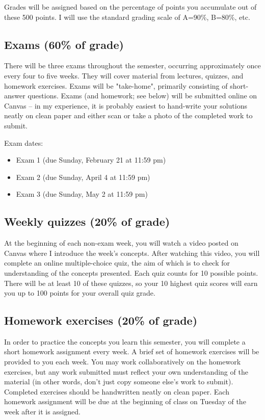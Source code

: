\documentclass[10pt]{article}
\begin{document}
Grades will be assigned based on the percentage of points you accumulate out of these 500 points.  I will use the standard grading scale of A=90\%, B=80\%, etc.

\subsection*{Exams (60\% of grade)}
\label{sec:org12679ab}
There will be three exams throughout the semester, occurring approximately once every four to five weeks.  They will cover material from lectures, quizzes, and homework exercises. Exams will be "take-home", primarily consisting of short-answer questions. Exams (and homework; see below) will be submitted online on Canvas -- in my experience, it is probably easiest to hand-write your solutions neatly on clean paper and either scan or take a photo of the completed work to submit. 

Exam dates:

\begin{itemize}
\item Exam 1 (due Sunday, February 21 at 11:59 pm)
\item Exam 2 (due Sunday, April 4 at 11:59 pm)
\item Exam 3 (due Sunday, May 2 at 11:59 pm)
\end{itemize}

\subsection*{Weekly quizzes (20\% of grade)}
\label{sec:orge77e0d2}

At the beginning of each non-exam week, you will watch a video posted on Canvas where I introduce the week's concepts. After watching this video, you will complete an online multiple-choice quiz, the aim of which is to check for understanding of the concepts presented. Each quiz counts for 10 possible points. There will be at least 10 of these quizzes, so your 10 highest quiz scores will earn you up to 100 points for your overall quiz grade.

\subsection*{Homework exercises (20\% of grade)}
\label{sec:org3b9e30d}
In order to practice the concepts you learn this semester, you will complete a short homework assignment every week. A brief set of homework exercises will be provided to you each week. You may work collaboratively on the homework exercises, but any work submitted must reflect your own understanding of the material (in other words, don't just copy someone else's work to submit). Completed exercises should be handwritten neatly on clean paper. Each homework assignment will be due at the beginning of class on Tuesday of the week after it is assigned.
\end{document}
